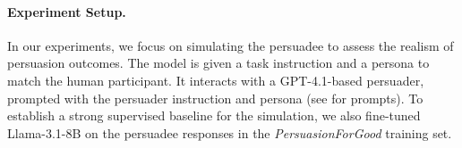 

\paragraph{Experiment Setup.} 

In our experiments, we focus on simulating the persuadee to assess the realism of persuasion outcomes. The model is given a task instruction and a persona to match the human participant. It interacts with a  GPT-4.1-based persuader, prompted with the persuader instruction and persona (see  for prompts). To establish a strong supervised baseline for the simulation, we also fine-tuned Llama-3.1-8B on the persuadee responses in the \textit{PersuasionForGood} training set. %

